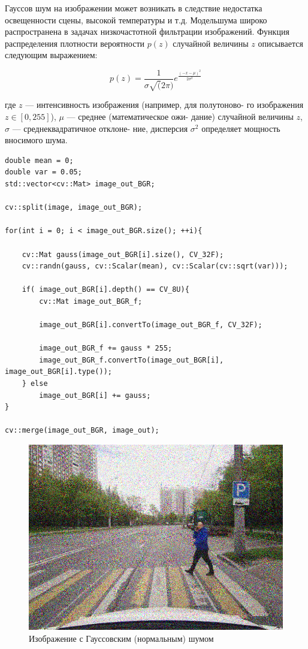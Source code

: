 Гауссов шум на изображении может возникать в следствие недостатка освещенности сцены, 
высокой температуры и т.д. Модельшума широко распространена в задачах низкочастотной 
фильтрации изображений. Функция распределения плотности вероятности
$p(z)$ случайной величины $z$ описывается следующим выражением:

\begin{equation}
    p(z) = \frac{1}{\sigma \sqrt(2\pi)} e ^{\frac{(-x-\mu)^2}{2\sigma^2}}
\label{eq:complex_func}
\end{equation}

где $z$ — интенсивность изображения (например, для полутоново-
го изображения $z \in [0,255]$), $\mu$ — среднее (математическое ожи-
дание) случайной величины $z$, $\sigma$ — среднеквадратичное отклоне-
ние, дисперсия $\sigma ^ 2$ определяет мощность вносимого шума.
  
\pagebreak

\begin{lstlisting}[style=cpp_white, caption={Исходный код для применения Гауссовского (нормального) шума к изображению}]
double mean = 0;
double var = 0.05;
std::vector<cv::Mat> image_out_BGR;

cv::split(image, image_out_BGR);

for(int i = 0; i < image_out_BGR.size(); ++i){

    cv::Mat gauss(image_out_BGR[i].size(), CV_32F);
    cv::randn(gauss, cv::Scalar(mean), cv::Scalar(cv::sqrt(var)));

    if( image_out_BGR[i].depth() == CV_8U){
        cv::Mat image_out_BGR_f;

        image_out_BGR[i].convertTo(image_out_BGR_f, CV_32F);

        image_out_BGR_f += gauss * 255;
        image_out_BGR_f.convertTo(image_out_BGR[i], image_out_BGR[i].type());
    } else
        image_out_BGR[i] += gauss;
}

cv::merge(image_out_BGR, image_out);
\end{lstlisting}

\begin{figure}[ht]
    \includegraphics[width=\textwidth]{../outputs/image_gauss_noise.png}
    \caption{Изображение с Гауссовским (нормальным) шумом}
    \label{fig:impulse_image}
\end{figure}

